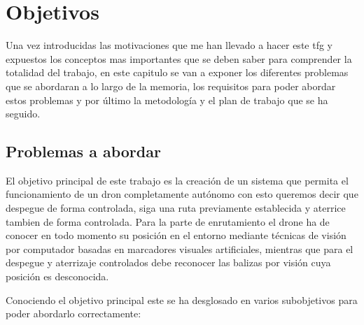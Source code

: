 \chapter{Objetivos}\label{cap.objetivos}
\hspace{1cm} Una vez introducidas las motivaciones que me han llevado a hacer este tfg y expuestos los conceptos mas importantes que se deben saber para comprender la totalidad del trabajo, en este capitulo se van a exponer los diferentes problemas que se abordaran a lo largo de la memoria, los requisitos para poder abordar estos problemas y por último la metodología y el plan de trabajo que se ha seguido. 


\section{Problemas a abordar}
\hspace{1cm} El objetivo principal de este trabajo es la creación de un sistema  que permita el funcionamiento de un dron completamente autónomo con esto queremos decir que despegue de forma controlada, siga una ruta previamente establecida y aterrice tambien de forma controlada. Para la parte de enrutamiento el drone ha de conocer en todo momento su posición en
el entorno mediante técnicas de visión por computador basadas en marcadores visuales
artificiales, mientras que para el despegue y aterrizaje controlados debe reconocer las balizas por visión cuya posición es desconocida. 

\hspace{1cm} Conociendo el objetivo principal este se ha desglosado en varios subobjetivos para poder abordarlo correctamente:

